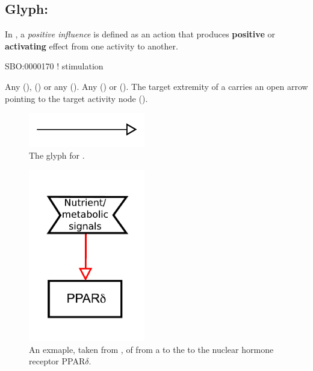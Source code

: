 \subsection{Glyph: }
\label{sec:af:positive_infl}

In \SBGNAFLone, a \emph{positive influence} is defined as an action that produces \textbf{positive} or \textbf{activating} effect from one activity to another.

\begin{glyphDescription}

\glyphSboTerm SBO:0000170 ! stimulation

 \glyphOrigin Any  (),   () or any  ().
 \glyphTarget Any  () or  ().
 \glyphEndPoint The target extremity of a  carries an open arrow pointing to the target activity node ().

\end{glyphDescription}

\begin{figure}[H]
  \centering
  \includegraphics[width = 2in]{images/positiveInfluence}
  \caption{The \AF glyph for .}
  \label{fig:af:positiveInfl}
\end{figure}

\begin{figure}[H]
  \centering
  \includegraphics[width = 2in]{examples/ex-positiveInfluence}
  \caption{An exmaple, taken from , of  from a  to the to the nuclear hormone receptor PPAR$\delta$.}
  \label{fig:af:exPI}
\end{figure} 